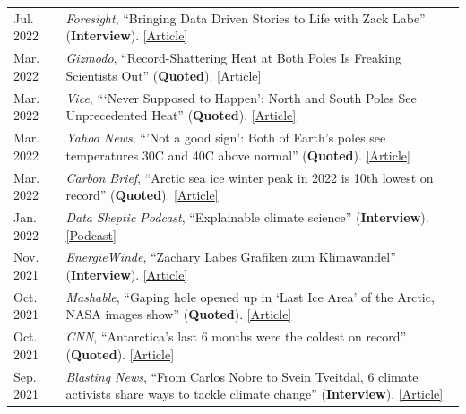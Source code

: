 \documentclass[margin,line,palatino,courier,10pt]{res}
\begin{document}
\begin{resume}
\begin{tabular}{@{}p{0.9in}p{4in}}
Jul. 2022 & \textit{Foresight}, ``Bringing Data Driven Stories to Life with Zack Labe'' (\textbf{Interview}). \href{https://www.climateforesight.eu/interview/bringing-data-driven-stories-to-life-with-zack-labe/}{[Article]}\\
Mar. 2022 & \textit{Gizmodo}, ``Record-Shattering Heat at Both Poles Is Freaking Scientists Out'' (\textbf{Quoted}). \href{https://gizmodo.com/record-shattering-heat-at-both-poles-is-freaking-scient-1848687193}{[Article]}\\
Mar. 2022 & \textit{Vice}, ```Never Supposed to Happen': North and South Poles See Unprecedented Heat'' (\textbf{Quoted}). \href{https://www.vice.com/en/article/5dg4va/never-supposed-to-happen-north-and-south-poles-see-unprecedented-heat}{[Article]}\\
Mar. 2022 & \textit{Yahoo News}, ``'Not a good sign': Both of Earth’s poles see temperatures 30C and 40C above normal'' (\textbf{Quoted}). \href{https://news.yahoo.com/not-a-good-sign-both-of-earths-poles-see-temperatures-30-c-and-40-c-above-normal-155815110.html}{[Article]}\\
Mar. 2022 & \textit{Carbon Brief}, ``Arctic sea ice winter peak in 2022 is 10th lowest on record'' (\textbf{Quoted}). \href{https://www.carbonbrief.org/arctic-sea-ice-winter-peak-in-2022-is-10th-lowest-on-record}{[Article]}\\
Jan. 2022 & \textit{Data Skeptic Podcast}, ``Explainable climate science'' (\textbf{Interview}). \href{https://dataskeptic.com/blog/episodes/2022/explainable-climate-science}{[Podcast]}\\
Nov. 2021 & \textit{EnergieWinde}, ``Zachary Labes Grafiken zum Klimawandel'' (\textbf{Interview}). \href{https://energiewinde.orsted.de/klimawandel-umwelt/zachary-labe-grafiken-arktis-klimawandel-interview-wissenschaftskommunikation}{[Article]}\\
Oct. 2021 & \textit{Mashable}, ``Gaping hole opened up in `Last Ice Area' of the Arctic, NASA images show'' (\textbf{Quoted}). \href{https://mashable.com/article/arctic-climate-change}{[Article]}\\
Oct. 2021 & \textit{CNN}, ``Antarctica's last 6 months were the coldest on record'' (\textbf{Quoted}). \href{https://www.cnn.com/2021/10/09/weather/weather-record-cold-antarctica-climate-change/index.html}{[Article]}\\
Sep. 2021 & \textit{Blasting News}, ``From Carlos Nobre to Svein Tveitdal, 6 climate activists share ways to tackle climate change'' (\textbf{Interview}). \href{https://us.blastingnews.com/world/2021/01/from-carlos-nobre-to-svein-tveitdal-4-climate-activists-share-ways-to-tackle-climate-change-003258138.html}{[Article]}\\

\end{tabular}
\end{resume}
\end{document}
